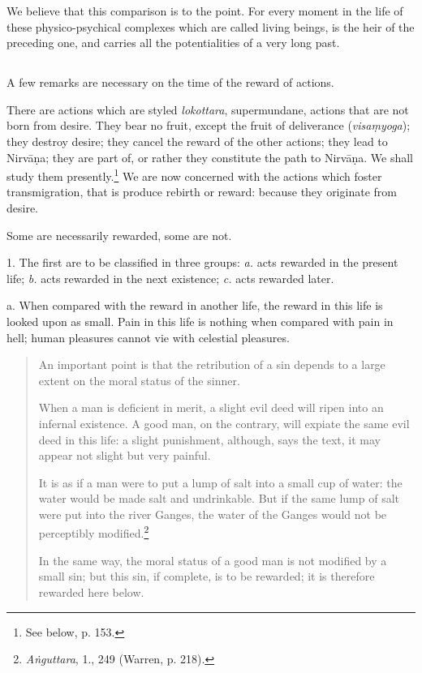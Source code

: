 \documentclass[a4paper, 11pt, oneside, english, landscape]{article}
\begin{document}
We believe that this comparison is to the point. For every moment in the life of these physico-psychical complexes which are called living beings, is the heir of the preceding one, and carries all the potentialities of a very long past.

\subsection{}
\paragraph{}
A few remarks are necessary on the time of the reward of actions.

There are actions which are styled \emph{lokottara}, supermundane, actions that are not born from desire. They bear no fruit, except the fruit of deliverance (\emph{visaṃyoga}); they destroy desire; they cancel the reward of the other actions; they lead to Nirvāṇa; they are part of, or rather they constitute the path to Nirvāṇa. We shall study them presently.\footnote{See below, p. 153.} We are now concerned with the actions which foster transmigration, that is produce rebirth or reward: because they originate from desire.

Some are necessarily rewarded, some are not.

1. The first are to be classified in three groups: \emph{a.} acts rewarded in the present life; \emph{b.} acts rewarded in the next existence; \emph{c.} acts rewarded later.

a. When compared with the reward in another life, the reward in this life is looked upon as small. Pain in this life is nothing when compared with pain in hell; human pleasures cannot vie with celestial pleasures.
\begin{quotation}
\small
An important point is that the retribution of a sin depends to a large extent on the moral status of the sinner.

When a man is deficient in merit, a slight evil deed will ripen into an infernal existence. A good man, on the contrary, will expiate the same evil deed in this life: a slight punishment, although, says the text, it may appear not slight but very painful.

It is as if a man were to put a lump of salt into a small cup of water: the water would be made salt and undrinkable. But if the same lump of salt were put into the river Ganges, the water of the Ganges would not be perceptibly modified.\footnote{\emph{Aṅguttara}, 1., 249 (Warren, p. 218).}

In the same way, the moral status of a good man is not modified by a small sin; but this sin, if complete, is to be rewarded; it is therefore rewarded here below.
\end{quotation}
\end{document}
